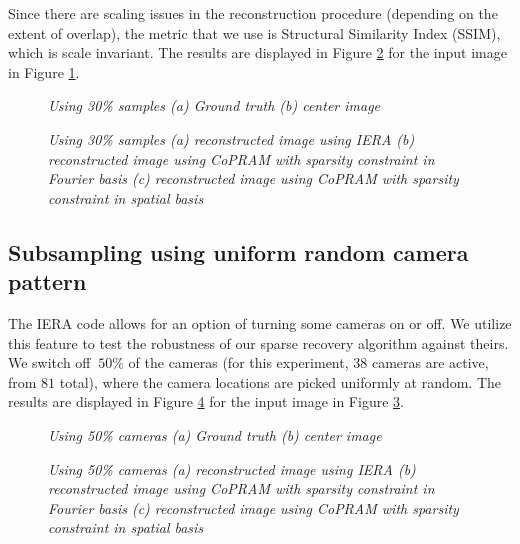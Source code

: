 \documentclass{article} %
\begin{document}
Since there are scaling issues in the reconstruction procedure (depending on the extent of overlap), the metric that we use is Structural Similarity Index (SSIM), which is scale invariant. The results are displayed in Figure \ref{fig:res_recons2} for the input image in Figure \ref{fig:res_recons1}.

\begin{figure}[!t]
	\centering
	\caption{\sl Using 30\% samples (a) Ground truth (b) center image } \label{fig:res_recons1}
\end{figure}

\begin{figure}[!t]
	\centering
	\caption{\sl Using 30\% samples (a) reconstructed image using IERA (b) reconstructed image using CoPRAM with sparsity constraint in Fourier basis (c) reconstructed image using CoPRAM with sparsity constraint in spatial basis} \label{fig:res_recons2}
\end{figure}
\newpage
\subsection{Subsampling using uniform random camera pattern}
The IERA code allows for an option of turning some cameras on or off. We utilize this feature to test the robustness of our sparse recovery algorithm against theirs. We switch off $~50\%$ of the cameras (for this experiment, $38$ cameras are active, from $81$ total), where the camera locations are picked uniformly at random. The results are displayed in Figure \ref{fig:rc_recons2} for the input image in Figure \ref{fig:rc_recons1}.

\begin{figure}[!t]
	\centering
	\caption{\sl Using 50\% cameras (a) Ground truth (b) center image } \label{fig:rc_recons1}
\end{figure}

\begin{figure}[!t]
	\centering
	\caption{\sl Using 50\% cameras (a) reconstructed image using IERA (b) reconstructed image using CoPRAM with sparsity constraint in Fourier basis (c) reconstructed image using CoPRAM with sparsity constraint in spatial basis} \label{fig:rc_recons2}
\end{figure}
\end{document}
